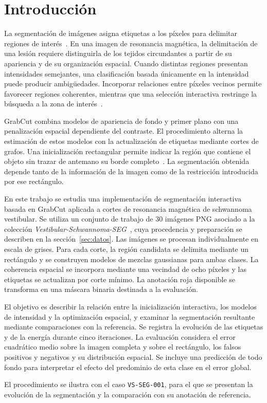 \section{Introducción}
\label{sec:introduccion}

La segmentación de imágenes asigna etiquetas a los píxeles para delimitar
regiones de interés~\cite{szeliski2011}. En una imagen de resonancia magnética, la delimitación
de una lesión requiere distinguirla de los tejidos circundantes a partir
de su apariencia y de su organización espacial. Cuando distintas regiones
presentan intensidades semejantes, una clasificación basada únicamente en
la intensidad puede producir ambigüedades. Incorporar relaciones entre
píxeles vecinos permite favorecer regiones coherentes, mientras que una
selección interactiva restringe la búsqueda a la zona de interés~\cite{boykov2001}.

GrabCut combina modelos de apariencia de fondo y primer plano con una
penalización espacial dependiente del contraste. El procedimiento alterna
la estimación de estos modelos con la actualización de etiquetas mediante
cortes de grafos. Una inicialización rectangular permite indicar la región
que contiene el objeto sin trazar de antemano su borde completo~\cite{rother2004}.
La segmentación obtenida depende tanto de la información de la imagen como
de la restricción introducida por ese rectángulo.

En este trabajo se estudia una implementación de segmentación interactiva
basada en GrabCut aplicada a cortes de resonancia magnética de schwannoma
vestibular. Se utiliza un conjunto de trabajo de 30 imágenes PNG asociado
a la colección \textit{Vestibular-Schwannoma-SEG}~\cite{shapeydatos}, cuya procedencia y
preparación se describen en la sección~\ref{sec:datos}. Las imágenes se
procesan individualmente en escala de grises. Para cada corte, la región
candidata se delimita mediante un rectángulo y se construyen modelos de
mezclas gaussianas para ambas clases. La coherencia espacial se incorpora
mediante una vecindad de ocho píxeles y las etiquetas se actualizan por
corte mínimo. La anotación roja disponible se transforma en una máscara
binaria destinada a la evaluación.

El objetivo es describir la relación entre la inicialización interactiva,
los modelos de intensidad y la optimización espacial, y examinar la
segmentación resultante mediante comparaciones con la referencia. Se
registra la evolución de las etiquetas y de la energía durante cinco
iteraciones. La evaluación considera el error cuadrático medio sobre la
imagen completa y sobre el rectángulo, los falsos positivos y negativos y
su distribución espacial. Se incluye una predicción de todo fondo para
interpretar el efecto del predominio de esta clase en el error global.

El procedimiento se ilustra con el caso \texttt{VS-SEG-001}, para el que
se presentan la evolución de la segmentación y la comparación con su
anotación de referencia.
